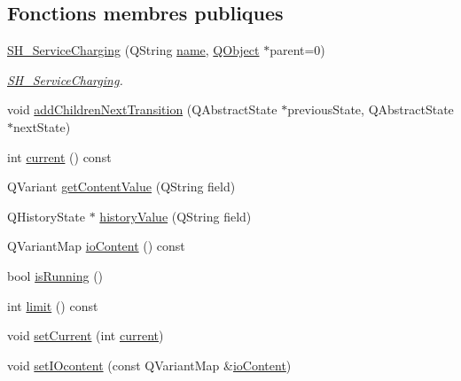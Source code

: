 \subsection*{Fonctions membres publiques}
\begin{DoxyCompactItemize}
\item 
\hyperlink{classSimpleHotel_1_1SH__ServiceCharging_ae82c86c7e955f0dc93cdfc3603789b87}{S\-H\-\_\-\-Service\-Charging} (Q\-String \hyperlink{classSimpleHotel_1_1SH__NamedObject_ad144716345034c91cface8f3163a799e}{name}, \hyperlink{classQObject}{Q\-Object} $\ast$parent=0)
\begin{DoxyCompactList}\small\item\em \hyperlink{classSimpleHotel_1_1SH__ServiceCharging}{S\-H\-\_\-\-Service\-Charging}. \end{DoxyCompactList}\item 
void \hyperlink{classSimpleHotel_1_1SH__LoopingInOutStateMachine_a2ac2ff43d97fd1b12e1b30d6818f33e4}{add\-Children\-Next\-Transition} (Q\-Abstract\-State $\ast$previous\-State, Q\-Abstract\-State $\ast$next\-State)
\item 
int \hyperlink{classSimpleHotel_1_1SH__LoopingInOutStateMachine_a8fea676c16c02ceb82cbb8a93088634e}{current} () const 
\item 
Q\-Variant \hyperlink{classSimpleHotel_1_1SH__InOutStateMachine_a4e2afab69163c7ce53dd6a40c793d5dc}{get\-Content\-Value} (Q\-String field)
\item 
Q\-History\-State $\ast$ \hyperlink{classSimpleHotel_1_1SH__InOutStateMachine_af9de98943b9428ed4144bc6695c1ada0}{history\-Value} (Q\-String field)
\item 
Q\-Variant\-Map \hyperlink{classSimpleHotel_1_1SH__InOutStateMachine_a378618937520bc65b6e25cd187a92aad}{io\-Content} () const 
\item 
bool \hyperlink{classSimpleHotel_1_1SH__GenericStateMachine_a23d9e26143a6732fa5a8f540eb827e03}{is\-Running} ()
\item 
int \hyperlink{classSimpleHotel_1_1SH__LoopingInOutStateMachine_a8a03fc485725d7cd8150dac26f2aa617}{limit} () const 
\item 
void \hyperlink{classSimpleHotel_1_1SH__LoopingInOutStateMachine_a353f7fbee54dd8e544b32c81db0658a2}{set\-Current} (int \hyperlink{classSimpleHotel_1_1SH__LoopingInOutStateMachine_a8fea676c16c02ceb82cbb8a93088634e}{current})
\item 
void \hyperlink{classSimpleHotel_1_1SH__InOutStateMachine_a60245aa45ba2b9720965412774e123fb}{set\-I\-Ocontent} (const Q\-Variant\-Map \&\hyperlink{classSimpleHotel_1_1SH__InOutStateMachine_a378618937520bc65b6e25cd187a92aad}{io\-Content})

\end{DoxyCompactItemize}
